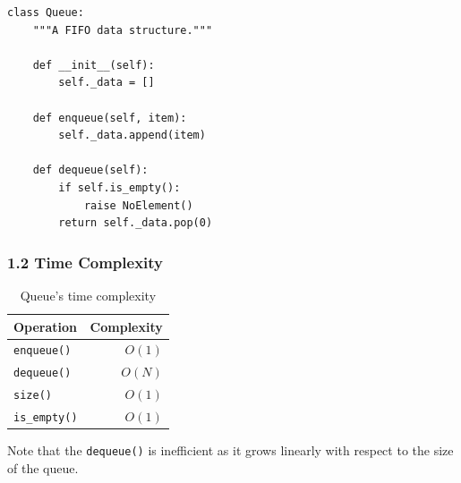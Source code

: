\documentclass[aspectratio=169, 14pt]{beamer}
\begin{document}
\begin{frame}[fragile]
\begin{columns}
\end{columns}


\end{frame}

\begin{frame}[fragile]
    \begin{verbatim}
class Queue:
    """A FIFO data structure."""

    def __init__(self):
        self._data = []

    def enqueue(self, item):
        self._data.append(item)

    def dequeue(self):
        if self.is_empty():
            raise NoElement()
        return self._data.pop(0)
    \end{verbatim}
\end{frame}

\begin{frame}
    \frametitle{1.2 Time Complexity}
    \begin{table}
        \caption{Queue's time complexity}
        \begin{tabular}{lr}
          \toprule
          Operation & Complexity\\
          \midrule
          \texttt{enqueue()} & $O(1)$\\
          \texttt{dequeue()} & $O(N)$ \\
          \texttt{size()} & $O(1)$ \\
          \texttt{is\_empty()} & $O(1)$ \\ 
          \bottomrule
        \end{tabular}
    \end{table}    
    Note that the \texttt{dequeue()} is inefficient as it grows linearly with respect to the size of the queue.
\end{frame}
\end{document}
